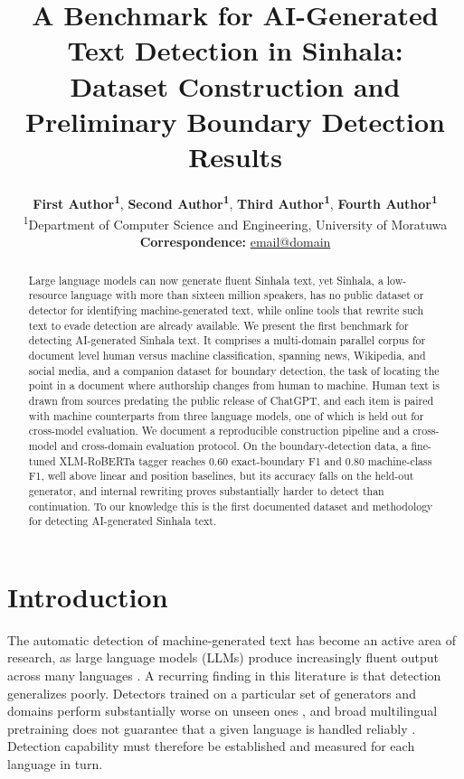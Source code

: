\documentclass[11pt]{article}
\title{A Benchmark for AI-Generated Text Detection in Sinhala: \\
Dataset Construction and Preliminary Boundary Detection Results}
\author{
  \textbf{First Author\textsuperscript{1}},
  \textbf{Second Author\textsuperscript{1}},
  \textbf{Third Author\textsuperscript{1}},
  \textbf{Fourth Author\textsuperscript{1}} \\
  \textsuperscript{1}Department of Computer Science and Engineering, University of Moratuwa \\
  \small{\textbf{Correspondence:} \href{mailto:email@domain}{email@domain}}
}
\begin{document}
\maketitle

\begin{abstract}
Large language models can now generate fluent Sinhala text, yet Sinhala, a low-resource language with more than sixteen million speakers, has no public dataset or detector for identifying machine-generated text, while online tools that rewrite such text to evade detection are already available. We present the first benchmark for detecting AI-generated Sinhala text. It comprises a multi-domain parallel corpus for document level human versus machine classification, spanning news, Wikipedia, and social media, and a companion dataset for boundary detection, the task of locating the point in a document where authorship changes from human to machine. Human text is drawn from sources predating the public release of ChatGPT, and each item is paired with machine counterparts from three language models, one of which is held out for cross-model evaluation. We document a reproducible construction pipeline and a cross-model and cross-domain evaluation protocol. On the boundary-detection data, a fine-tuned XLM-RoBERTa tagger reaches 0.60 exact-boundary F1 and 0.80 machine-class F1, well above linear and position baselines, but its accuracy falls on the held-out generator, and internal rewriting proves substantially harder to detect than continuation. To our knowledge this is the first documented dataset and methodology for detecting AI-generated Sinhala text.
\end{abstract}

\section{Introduction}

The automatic detection of machine-generated text has become an active area of research, as large language models (LLMs) produce increasingly fluent output across many languages \citep{li-etal-2024-mage, wang-etal-2024-m4}. A recurring finding in this literature is that detection generalizes poorly. Detectors trained on a particular set of generators and domains perform substantially worse on unseen ones \citep{wang-etal-2024-m4, wang-etal-2024-m4gt}, and broad multilingual pretraining does not guarantee that a given language is handled reliably \citep{macko-etal-2023-multitude}. Detection capability must therefore be established and measured for each language in turn.
\end{document}
